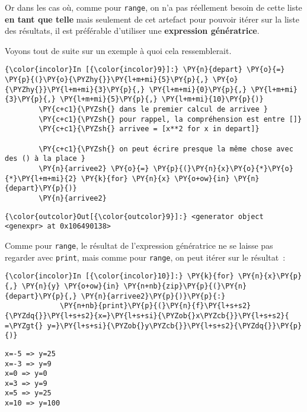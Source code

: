 Or dans les cas où, comme pour \texttt{range}, on n'a pas réellement
besoin de cette liste \textbf{en tant que telle} mais seulement de cet
artefact pour pouvoir itérer sur la liste des résultats, il est
préférable d'utiliser une \textbf{expression génératrice}.

Voyons tout de suite sur un exemple à quoi cela ressemblerait.

    \begin{Verbatim}[commandchars=\\\{\}]
{\color{incolor}In [{\color{incolor}9}]:} \PY{n}{depart} \PY{o}{=} \PY{p}{(}\PY{o}{\PYZhy{}}\PY{l+m+mi}{5}\PY{p}{,} \PY{o}{\PYZhy{}}\PY{l+m+mi}{3}\PY{p}{,} \PY{l+m+mi}{0}\PY{p}{,} \PY{l+m+mi}{3}\PY{p}{,} \PY{l+m+mi}{5}\PY{p}{,} \PY{l+m+mi}{10}\PY{p}{)}
        \PY{c+c1}{\PYZsh{} dans le premier calcul de arrivee }
        \PY{c+c1}{\PYZsh{} pour rappel, la compréhension est entre []}
        \PY{c+c1}{\PYZsh{} arrivee = [x**2 for x in depart]}
        
        \PY{c+c1}{\PYZsh{} on peut écrire presque la même chose avec des () à la place }
        \PY{n}{arrivee2} \PY{o}{=} \PY{p}{(}\PY{n}{x}\PY{o}{*}\PY{o}{*}\PY{l+m+mi}{2} \PY{k}{for} \PY{n}{x} \PY{o+ow}{in} \PY{n}{depart}\PY{p}{)}
        \PY{n}{arrivee2}
\end{Verbatim}


\begin{Verbatim}[commandchars=\\\{\}]
{\color{outcolor}Out[{\color{outcolor}9}]:} <generator object <genexpr> at 0x106490138>
\end{Verbatim}
            
    Comme pour \texttt{range}, le résultat de l'expression génératrice ne se
laisse pas regarder avec \texttt{print}, mais comme pour \texttt{range},
on peut itérer sur le résultat~:

    \begin{Verbatim}[commandchars=\\\{\}]
{\color{incolor}In [{\color{incolor}10}]:} \PY{k}{for} \PY{n}{x}\PY{p}{,} \PY{n}{y} \PY{o+ow}{in} \PY{n+nb}{zip}\PY{p}{(}\PY{n}{depart}\PY{p}{,} \PY{n}{arrivee2}\PY{p}{)}\PY{p}{:}
             \PY{n+nb}{print}\PY{p}{(}\PY{n}{f}\PY{l+s+s2}{\PYZdq{}}\PY{l+s+s2}{x=}\PY{l+s+si}{\PYZob{}x\PYZcb{}}\PY{l+s+s2}{ =\PYZgt{} y=}\PY{l+s+si}{\PYZob{}y\PYZcb{}}\PY{l+s+s2}{\PYZdq{}}\PY{p}{)}
\end{Verbatim}


    \begin{Verbatim}[commandchars=\\\{\}]
x=-5 => y=25
x=-3 => y=9
x=0 => y=0
x=3 => y=9
x=5 => y=25
x=10 => y=100

    \end{Verbatim}


